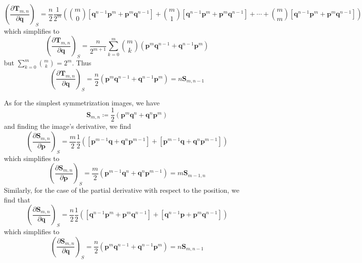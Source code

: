 \documentclass[a4paper]{article}
\theoremstyle{definition}
\begin{document}
\begin{equation}
	\left( \frac{\partial\textbf{T}_{m,n}}{\partial\textbf{q}}\right) _S=\frac{n}{2}\frac{1}{2^m}\left(\binom{m}{0}[\textbf{q}^{n-1}\textbf{p}^m+\textbf{p}^m\textbf{q}^{n-1}]+\binom{m}{1}[\textbf{q}^{n-1}\textbf{p}^m+\textbf{p}^m\textbf{q}^{n-1}]+\cdots+\binom{m}{m}[\textbf{q}^{n-1}\textbf{p}^m+\textbf{p}^m\textbf{q}^{n-1}]\right)
\end{equation}
which simplifies to
\begin{equation}
	\left( \frac{\partial\textbf{T}_{m,n}}{\partial\textbf{q}}\right) _S=\frac{n}{2^{m+1}}\sum_{k=0}^m\binom{m}{k}(\textbf{p}^{m}\textbf{q}^{n-1}+\textbf{q}^{n-1}\textbf{p}^{m})
\end{equation}
but $\displaystyle\sum_{k=0}^m\binom{m}{k}=2^m$. Thus
\begin{equation}
	\left( \frac{\partial\textbf{T}_{m,n}}{\partial\textbf{q}}\right) _S=\frac{n}{2}(\textbf{p}^{m}\textbf{q}^{n-1}+\textbf{q}^{n-1}\textbf{p}^{m})=n\textbf{S}_{m,n-1}
\end{equation}

As for the simplest symmetrization images, we have
\begin{equation}
	\textbf{S}_{m,n}\coloneqq\frac{1}{2}(\textbf{p}^m\textbf{q}^n+\textbf{q}^n\textbf{p}^m)
\end{equation}
and finding the image's derivative, we find
\begin{equation}
	\left(\frac{\partial\textbf{S}_{m,n}}{\partial\textbf{p}}\right)_S=\frac{m}{2}\frac{1}{2}\left( [\textbf{p}^{m-1}\textbf{q}+\textbf{q}^n\textbf{p}^{m-1}]+[\textbf{p}^{m-1}\textbf{q}+\textbf{q}^n\textbf{p}^{m-1}]\right) 
\end{equation}
which simplifies to
\begin{equation}
	\left(\frac{\partial\textbf{S}_{m,n}}{\partial\textbf{p}}\right)_S=\frac{m}{2}\left(\textbf{p}^{m-1}\textbf{q}^n+\textbf{q}^n\textbf{p}^{m-1}\right) =m\textbf{S}_{m-1,n}
\end{equation}
Similarly, for the case of the partial derivative with respect to the position, we find that
\begin{equation}
	\left(\frac{\partial\textbf{S}_{m,n}}{\partial\textbf{q}}\right)_S=\frac{n}{2}\frac{1}{2}\left( [\textbf{q}^{n-1}\textbf{p}^m+\textbf{p}^m\textbf{q}^{n-1}]+[\textbf{q}^{n-1}\textbf{p}+\textbf{p}^m\textbf{q}^{n-1}]\right) 
\end{equation}
which simplifies to
\begin{equation}
	\left(\frac{\partial\textbf{S}_{m,n}}{\partial\textbf{q}}\right)_S=\frac{n}{2}\left(\textbf{p}^{m}\textbf{q}^{n-1}+\textbf{q}^{n-1}\textbf{p}^{m}\right) =n\textbf{S}_{m,n-1}
\end{equation}
\end{document}

